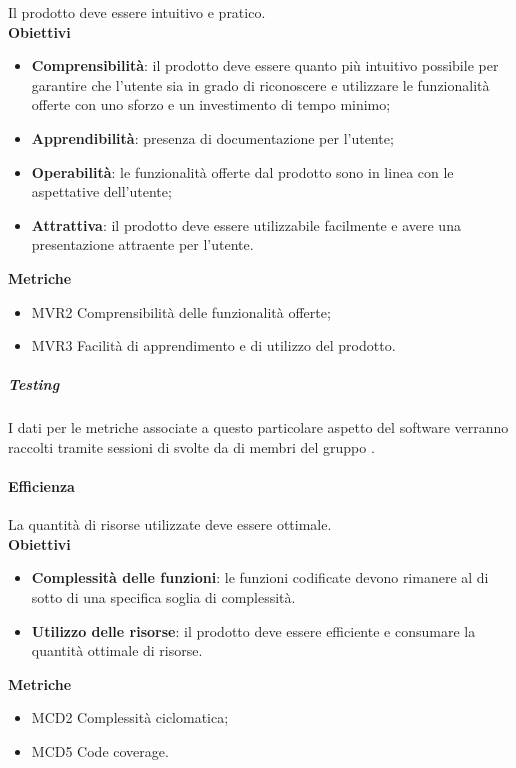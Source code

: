 Il prodotto deve essere intuitivo e pratico. \\

\textbf{Obiettivi}
\begin{itemize}
\item \textbf{Comprensibilità}: il prodotto deve essere quanto più intuitivo possibile per garantire che l'utente sia in grado di riconoscere e utilizzare le funzionalità offerte con uno sforzo e un investimento di tempo minimo;
\item \textbf{Apprendibilità}: presenza di documentazione per l'utente;
\item \textbf{Operabilità}: le funzionalità offerte dal prodotto sono in linea con le aspettative dell'utente;
\item \textbf{Attrattiva}: il prodotto deve essere utilizzabile facilmente e avere una presentazione attraente per l'utente.
\end{itemize}

\textbf{Metriche}
\begin{itemize}
\item MVR2 Comprensibilità delle funzionalità offerte;
\item MVR3 Facilità di apprendimento e di utilizzo del prodotto.
\end{itemize}

\subparagraph{Testing}
I dati per le metriche associate a questo particolare aspetto del software verranno raccolti tramite sessioni di  svolte da di membri del gruppo \gruppo{}. \\


\paragraph{Efficienza}

La quantità di risorse utilizzate deve essere ottimale. \\

\textbf{Obiettivi}
\begin{itemize}
\item \textbf{Complessità delle funzioni}: le funzioni codificate devono rimanere al di sotto di una specifica soglia di complessità.
\item \textbf{Utilizzo delle risorse}: il prodotto deve essere efficiente e consumare la quantità ottimale di risorse.
\end{itemize}

\textbf{Metriche}
\begin{itemize}
\item MCD2 Complessità ciclomatica;
\item MCD5 Code coverage.
\end{itemize}

